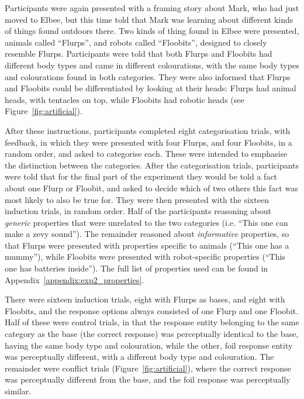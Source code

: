 Participants were again presented with a framing story about Mark,
who had just moved to Elbee,
but this time told that Mark was learning about
different kinds of things found outdoors there.
Two kinds of thing found in Elbee were presented,
animals called ``Flurps'', and robots called ``Floobits'',
designed to closely resemble Flurps.
Participants were told that both Flurps and Floobits
had different body types
and came in different colourations,
with the same body types and colourations found in both categories.
They were also informed that Flurps and Floobits could be
differentiated by looking at their heads:
Flurps had animal heads, with tentacles on top,
while Floobits had robotic heads
(see Figure~\ref{fig:artificial}).

After these instructions, participants completed eight categorisation trials,
with feedback,
in which they were presented with four Flurps, and four Floobits,
in a random order, and asked to categorise each.
These were intended to emphasise the distinction between the categories.
After the categorisation trials,
participants were told that for the final part of the experiment
they would be told a fact about one Flurp or Floobit,
and asked to decide which of two others
this fact was most likely to also be true for.
They were then presented with the sixteen induction trials, in random order.
Half of the participants reasoning about \emph{generic} properties
that were unrelated to the two categories
(i.e. ``This one can make a zevy sound'').
The remainder reasoned about \emph{informative} properties,
so that Flurps were presented with properties specific to animals
(``This one has a mummy''),
while Floobits were presented with robot-specific properties
(``This one has batteries inside'').
The full list of properties used can be found in
Appendix~\ref{appendix:exp2_properties}.

There were sixteen induction trials,
eight with Flurps as bases,
and eight with Floobits,
and the response options always consisted of
one Flurp and one Floobit.
Half of these were control trials,
in that the response entity belonging to
the same category as the base (the correct response)
was perceptually identical to the base,
having the same body type and colouration,
while the other, foil response entity was perceptually different,
with a different body type and colouration.
The remainder were conflict trials (Figure~\ref{fig:artificial}),
where the correct response was perceptually different from the base,
and the foil response was perceptually similar.

